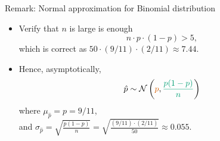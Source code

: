 \documentclass[
  11pt,
  ignorenonframetext,
]{beamer}
\providecommand{\tightlist}{%
  \setlength{\itemsep}{0pt}\setlength{\parskip}{0pt}}
\begin{document}
\begin{frame}{Remark: Normal approximation for Binomial distribution}
\protect\hypertarget{remark-normal-approximation-for-binomial-distribution}{}
\begin{itemize}
\tightlist
\item
  Verify that \(n\) is large is enough \[
  n \cdot p \cdot (1-p) > 5,
  \] which is correct as \(50 \cdot (9/11) \cdot (2/11) \approx 7.44\).
\end{itemize}

\vspace{3mm}

\begin{itemize}
\tightlist
\item
  Hence, asymptotically, \[
  \hat{p} \sim \mathcal{N} \left({\color{red}{p}}, {\color{green}{\frac{p(1-p)}{n}}} \right)
  \] where \(\mu_{\hat{p}} = p = 9/11\),\\
  and
  \(\sigma_{\hat{p}} = \sqrt{\frac{p(1-p)}{n}} = \sqrt{\frac{(9/11)\cdot (2/11)}{50}} \approx 0.055\).
\end{itemize}
\end{frame}
\end{document}
